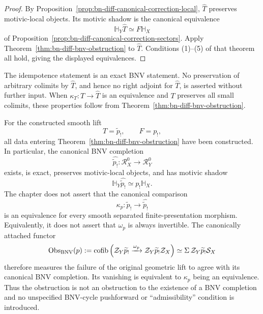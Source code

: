 \begin{proof}
By Proposition~\ref{prop:bn-diff-canonical-correction-local},
\(\widehat T\) preserves motivic-local objects.  Its motivic shadow is the
canonical equivalence
\[
  \mathbb H_Y\widehat T\simeq F\mathbb H_X
\]
of Proposition~\ref{prop:bn-diff-canonical-correction-sectors}.  Apply
Theorem~\ref{thm:bn-diff-bnv-obstruction} to \(\widehat T\).  Conditions
(1)--(5) of that theorem all hold, giving the displayed equivalences.
\end{proof}

\begin{remark}
The idempotence statement is an exact BNV statement.  No preservation of
arbitrary colimits by \(\widehat T\), and hence no right adjoint for
\(\widehat T\), is asserted without further input.  When
\(\kappa_T:T\to\widehat T\) is an equivalence and \(T\) preserves all small
colimits, these properties follow from
Theorem~\ref{thm:bn-diff-bnv-obstruction}.
\end{remark}

\begin{remark}
\label{rem:bn-diff-general-smooth-obstruction}
For the constructed smooth lift
\[
  T=\widetilde p_!,
  \qquad
  F=p_!,
\]
all data entering Theorem~\ref{thm:bn-diff-bnv-obstruction} have been
constructed.  In particular, the canonical BNV completion
\[
  \widehat{\widetilde p_!}:
  \mathcal R_X^0\longrightarrow\mathcal R_Y^0
\]
exists, is exact, preserves motivic-local objects, and has motivic shadow
\[
  \mathbb H_Y\widehat{\widetilde p_!}
  \simeq
  p_!\mathbb H_X.
\]
The chapter does not assert that the canonical comparison
\[
  \kappa_p:
  \widetilde p_!
  \longrightarrow
  \widehat{\widetilde p_!}
\]
is an equivalence for every smooth separated finite-presentation morphism.
Equivalently, it does not assert that \(\omega_p\) is always invertible.  The
canonically attached functor
\[
  \operatorname{Obs}_{\mathrm{BNV}}(p)
  :=
  \operatorname{cofib}\left(
    \mathcal Z_Y\widetilde p_!
    \xrightarrow{\omega_p}
    \mathcal Z_Y\widetilde p_!\mathcal Z_X
  \right)
  \simeq
  \Sigma\,\mathcal Z_Y\widetilde p_!\mathcal S_X
\]
therefore measures the failure of the original geometric lift to agree with
its canonical BNV completion.  Its vanishing is equivalent to
\(\kappa_p\) being an equivalence.  Thus the obstruction is not an obstruction
to the existence of a BNV completion and no unspecified BNV-cycle pushforward
or ``admissibility'' condition is introduced.
\end{remark}

